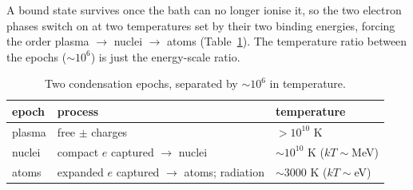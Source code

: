 \documentclass[11pt]{article}
\begin{document}
A bound state survives once the bath can no longer ionise it, so the two electron phases switch on at two
temperatures set by their two binding energies, forcing the order plasma $\to$ nuclei $\to$ atoms
(Table~\ref{tab:epochs}). The temperature ratio between the epochs (${\sim}10^6$) is just the energy-scale ratio.

\begin{table}[h]\centering
\begin{tabular}{lll}
\toprule
epoch & process & temperature \\
\midrule
plasma & free $\pm$ charges & $>10^{10}$ K \\
nuclei & compact $e$ captured $\to$ nuclei & ${\sim}10^{10}$ K ($kT{\sim}$MeV) \\
atoms & expanded $e$ captured $\to$ atoms; radiation & ${\sim}3000$ K ($kT{\sim}$eV) \\
\bottomrule
\end{tabular}
\caption{Two condensation epochs, separated by ${\sim}10^6$ in temperature.}\label{tab:epochs}
\end{table}
\end{document}
